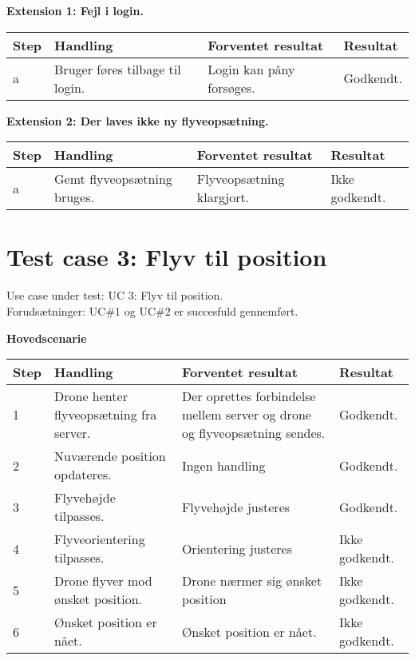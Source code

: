 \textbf{Extension 1: Fejl i login.}
\begin{table}[H]
	\centering
		\begin{tabular}{|l|p{5 cm}|p{5 cm}|p{2.5 cm}|} 
		\hline
			\textbf{Step} & \textbf{Handling} & \textbf{Forventet resultat} & \textbf{Resultat} \\ \hline
			a & Bruger føres tilbage til login. & Login kan påny forsøges. & Godkendt. \\ \hline
		\end{tabular}
\end{table}

\textbf{Extension 2: Der laves ikke ny flyveopsætning.}
\begin{table}[H]
	\centering
		\begin{tabular}{|l|p{5 cm}|p{5 cm}|p{2.5 cm}|} 
		\hline
			\textbf{Step} & \textbf{Handling} & \textbf{Forventet resultat} & \textbf{Resultat} \\ \hline
			a & Gemt flyveopsætning bruges. & Flyveopsætning klargjort. & Ikke godkendt.\\ \hline
		\end{tabular}
\end{table}

\newpage

\section{Test case 3: Flyv til position}
Use case under test: UC 3: Flyv til position.\\
Forudsætninger:	UC\#1 og UC\#2 er succesfuld gennemført.

\textbf{Hovedscenarie}
\begin{table}[H]
	\centering
		\begin{tabular}{|l|p{5 cm}|p{5 cm}|p{2.5 cm}|} 
		\hline
			\textbf{Step} & \textbf{Handling} & \textbf{Forventet resultat} & \textbf{Resultat} \\ \hline
			1 & Drone henter flyveopsætning fra server. & Der oprettes forbindelse \newline mellem server og drone \newline og flyveopsætning sendes. & Godkendt. \\ \hline
			2 & Nuværende position \newline opdateres. & Ingen handling  &  Godkendt. \\ \hline
			3 & Flyvehøjde tilpasses. & Flyvehøjde justeres & Godkendt. \\ \hline
			4 & Flyveorientering tilpasses. & Orientering justeres & Ikke godkendt. \\ \hline
			5 & Drone flyver mod \newline ønsket position. & Drone nærmer sig \newline ønsket position  &  Ikke godkendt. \\ \hline
			6 & Ønsket position er nået. & Ønsket position er nået. & Ikke godkendt. \\ \hline
		\end{tabular}
\end{table}

